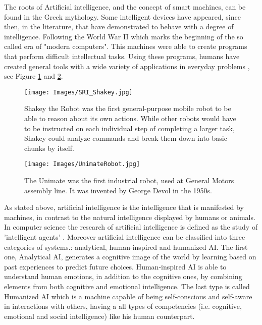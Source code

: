 The roots of Artificial intelligence, and the concept of smart machines, can be found in the Greek mythology. Some intelligent devices have appeared, since then, in the literature, that have demonstrated to behave with a degree of intelligence. Following the World War II which marks the beginning of the so called era of "modern computers". This machines were able to create programs that perform difficult intellectual tasks. Using these programs, humans have created general tools with a wide variety of applications in everyday problems \cite{briefAIHistory}, see Figure \ref{fig:SRI_Robot} and \ref{fig:Unimate_Robot}.

\begin{figure}[h!]
    \centering
    \texttt{[image: Images/SRI\_Shakey.jpg]}
    \caption[Shakey the Robot]{Shakey the Robot was the first general-purpose mobile robot to be able to reason about its own actions. While other robots would have to be instructed on each individual step of completing a larger task, Shakey could analyze commands and break them down into basic chunks by itself.\protect\footnotemark}
    \label{fig:SRI_Robot}
\end{figure}


\begin{figure}[h!]
    \centering
    \texttt{[image: Images/UnimateRobot.jpg]}
    \caption[Unimate]{The Unimate was the first industrial robot, used at General Motors assembly line. It was invented by George Devol in the 1950s.\protect\footnotemark}
    \label{fig:Unimate_Robot}
\end{figure}


As stated above, artificial intelligence is the intelligence that is manifested by machines, in contrast to the natural intelligence displayed by humans or animals. In computer science the research of artificial intelligence is defined as the study of 'intelligent agents' \cite{IntelliAgents}. Moreover artificial intelligence can be classified into three categories of systems.: analytical, human-inspired and humanized AI. The first one, Analytical AI, generates a cognitive image of the world by learning based on past experiences to predict future choices.  Human-inspired AI is able to understand human emotions, in addition to the cognitive ones, by combining elements from both cognitive and emotional intelligence. The last type is called Humanized AI which is a machine capable of being self-conscious and self-aware in interactions with others, having a all types of competencies (i.e. cognitive, emotional and social intelligence) like his human counterpart. \par

